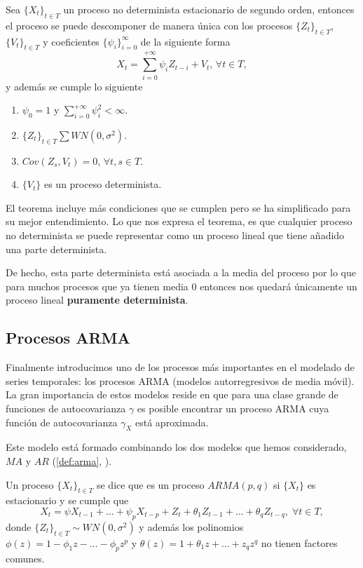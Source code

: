 \begin{teorema}
  Sea $\{X_t\}_{t \in T}$ un proceso no determinista estacionario de segundo orden, entonces el proceso se puede descomponer de manera única con los procesos $\{Z_t\}_{t \in T}$, $\{V_t\}_{t \in T}$ y coeficientes $\{\psi_i\}_{i = 0}^{\infty}$ de la siguiente forma
  $$ X_t = \sum \limits^{+\infty}_{i = 0} \psi_i Z_{t - i} + V_t, \, \forall t \in T,$$
  y además se cumple lo siguiente
  \begin{enumerate}
    \item $\psi_0 = 1$ y $\sum^{+\infty}_{i = 0} \psi^2_i < \infty$.
    \item $\{Z_t\}_{t \in T} \sum WN(0, \sigma^2)$.
    \item $Cov(Z_s, V_t) = 0$, $\forall t,s \in T$.
    \item $\{V_t\}$ es un proceso determinista.
  \end{enumerate}
  \label{th:wold}
\end{teorema}

El teorema incluye más condiciones que se cumplen pero se ha simplificado para su mejor entendimiento. Lo que nos expresa el teorema, es que cualquier proceso no determinista se puede representar como un proceso lineal que tiene añadido una parte determinista.

De hecho, esta parte determinista está asociada a la media del proceso por lo que para muchos procesos que ya tienen media 0 entonces nos quedará únicamente un proceso lineal \textbf{puramente determinista}.

\subsection{Procesos ARMA}

Finalmente introducimos uno de los procesos más importantes en el modelado de series temporales: los procesos ARMA (modelos autorregresivos de media móvil). La gran importancia de estos modelos reside en que para una clase grande de funciones de autocovarianza $\gamma$ es posible encontrar un proceso ARMA cuya función de autocovarianza $\gamma_X$ está aproximada.

Este modelo está formado combinando los dos modelos que hemos considerado, $MA$ y $AR$ (\autoref{def:arma}, \cite{whittle1951arma}).

\begin{definicion}
  Un proceso $\{X_t\}_{t \in T}$ se dice que es un proceso $ARMA(p, q)$ si $\{X_t\}$ es estacionario y se cumple que
  $$X_t = \psi X_{t-1} + \ldots + \psi_p X_{t-p} + Z_t + \theta_1 Z_{t-1} + \ldots + \theta_q Z_{t - q}, \; \forall t \in T,$$
  donde $\{Z_t\}_{t \in T} \sim WN(0, \sigma^2)$ y además los polinomios $\phi(z) = 1 - \phi_1 z - \ldots - \phi_p z^p$ y $\theta(z) = 1 + \theta_1z + \ldots + z_q z^q$ no tienen factores comunes.
\label{def:arma}
\end{definicion}

